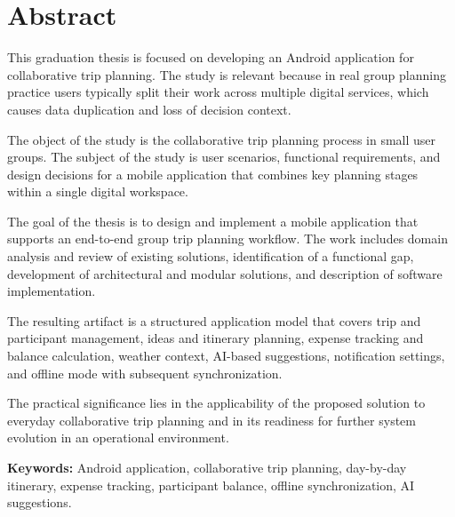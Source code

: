 \section*{Abstract}

This graduation thesis is focused on developing an Android application for collaborative trip planning. The study is relevant because in real group planning practice users typically split their work across multiple digital services, which causes data duplication and loss of decision context.

The object of the study is the collaborative trip planning process in small user groups. The subject of the study is user scenarios, functional requirements, and design decisions for a mobile application that combines key planning stages within a single digital workspace.

The goal of the thesis is to design and implement a mobile application that supports an end-to-end group trip planning workflow. The work includes domain analysis and review of existing solutions, identification of a functional gap, development of architectural and modular solutions, and description of software implementation.

The resulting artifact is a structured application model that covers trip and participant management, ideas and itinerary planning, expense tracking and balance calculation, weather context, AI-based suggestions, notification settings, and offline mode with subsequent synchronization.

The practical significance lies in the applicability of the proposed solution to everyday collaborative trip planning and in its readiness for further system evolution in an operational environment.

\textbf{Keywords:} Android application, collaborative trip planning, day-by-day itinerary, expense tracking, participant balance, offline synchronization, AI suggestions.
